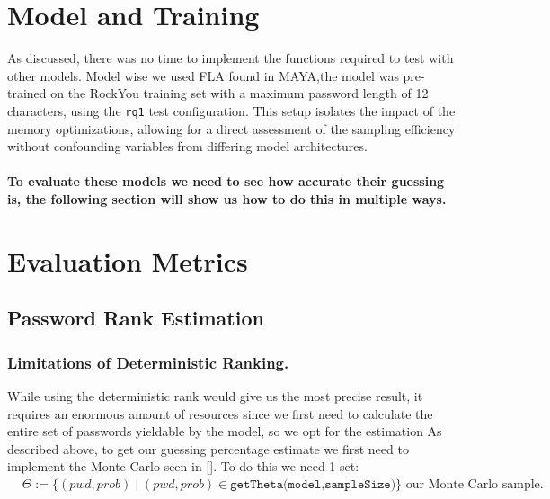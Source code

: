 \documentclass[english,noexaminfo,a4paper,oneside, binding = 0.6cm]{sapthesis}
\begin{document}
\section{Model and Training}
As discussed, there was no time to implement the functions required to test with other models.
Model wise we used FLA found in MAYA\cite{ref:maya},the model was pre-trained on the RockYou training set with
a maximum password length of 12 characters, using the \texttt{rq1} test configuration. 
This setup isolates the impact of the memory optimizations, allowing for a direct assessment of the sampling efficiency without confounding variables from differing model architectures.


\paragraph{To evaluate these models we need to see how accurate their guessing \cite{ref:fla} is, the following section will show us how to do this in multiple ways.}
\section{Evaluation Metrics} 
\subsection{Password Rank Estimation}
\subsubsection{Limitations of Deterministic Ranking.}
While using the deterministic rank would give us the most precise result, it requires an enormous amount of resources since we first need to calculate the entire set
of passwords yieldable by the model, so we opt for the estimation
As described above, to get our guessing percentage estimate we first need to implement the Monte Carlo seen in [\cite{ref:dellamico}].
To do this we need 1 set:
\begin{align*}
&\Theta := \{(pwd,prob)\mid (pwd,prob) \in \texttt{getTheta(model,sampleSize)}\} \text{ our Monte Carlo sample}.    
\end{align*}
\end{document}
